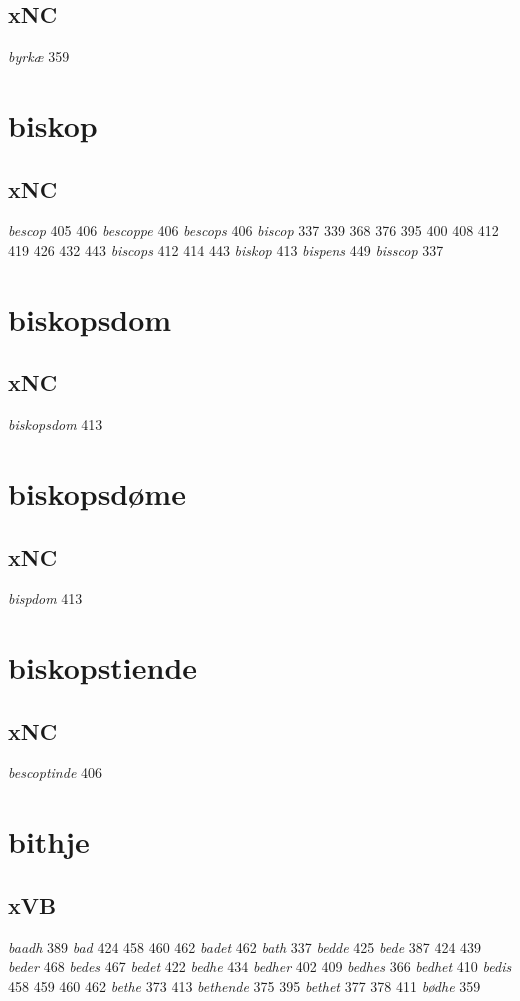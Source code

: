 \documentclass[a4paper,twocolumn]{article}
\begin{document}
\subsection{xNC}
\label{sec:org491cb21}
\emph{byrkæ} 359 
\section{biskop}
\label{sec:org3fc27bd}
\subsection{xNC}
\label{sec:orgce1440b}
\emph{bescop} 405 406 \emph{bescoppe} 406 \emph{bescops} 406 \emph{biscop} 337 339 368 376 395 400 408 412 419 426 432 443 \emph{biscops} 412 414 443 \emph{biskop} 413 \emph{bispens} 449 \emph{bisscop} 337 
\section{biskopsdom}
\label{sec:org25972ca}
\subsection{xNC}
\label{sec:org5e22be5}
\emph{biskopsdom} 413 
\section{biskopsdøme}
\label{sec:org7e6d602}
\subsection{xNC}
\label{sec:org205226c}
\emph{bispdom} 413 
\section{biskopstiende}
\label{sec:org3e5b94e}
\subsection{xNC}
\label{sec:org0381d72}
\emph{bescoptinde} 406 
\section{bithje}
\label{sec:org62c56b8}
\subsection{xVB}
\label{sec:org677e5cf}
\emph{baadh} 389 \emph{bad} 424 458 460 462 \emph{badet} 462 \emph{bath} 337 \emph{bedde} 425 \emph{bede} 387 424 439 \emph{beder} 468 \emph{bedes} 467 \emph{bedet} 422 \emph{bedhe} 434 \emph{bedher} 402 409 \emph{bedhes} 366 \emph{bedhet} 410 \emph{bedis} 458 459 460 462 \emph{bethe} 373 413 \emph{bethende} 375 395 \emph{bethet} 377 378 411 \emph{bødhe} 359 
\end{document}
